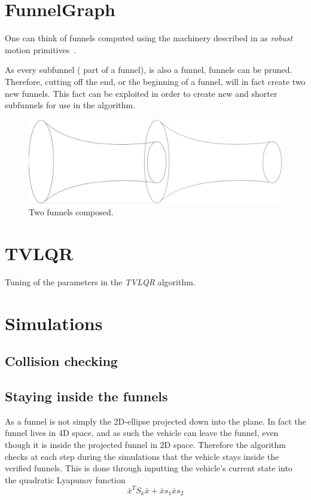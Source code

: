 \section{FunnelGraph}

One can think of funnels computed using the machinery described in
\cite[sec~4]{majumdarFunnelLibrariesRealtime2017} as \textit{robust} motion
primitives~\cite{majumdarFunnelLibrariesRealtime2017}.

As every subfunnel (\ie{} part of a funnel), is also a funnel, funnels can be
pruned. Therefore, cutting off the end, or the beginning of a funnel, will in
fact create two new funnels. This fact can be exploited in order to create new
and shorter subfunnels for use in the \rrtfunnel{} algorithm.

\begin{figure}
  \includegraphics[scale=.2]{figures/method/funnel-composition}
  \centering
  \caption{Two funnels composed.}
\end{figure}

\section{TVLQR}

Tuning of the parameters in the \textit{TVLQR} algorithm.

\section{Simulations}

\subsection{Collision checking}

\subsection{Staying inside the funnels}

As a funnel is not simply the 2D-ellipse projected down into the plane. In fact
the funnel lives in 4D space, and as such the vehicle can leave the funnel, even
though it is inside the projected funnel in 2D space. Therefore the \rrtfunnel{}
algorithm checks at each step during the simulations that the vehicle stays
inside the verified funnels. This is done through inputting the vehicle's
current state into the quadratic Lyapunov function
\[
  {\bar{x}}^{T}S_{k}\bar{x} + \bar{x}s_{1} \bar{x} s_{2}
\]

